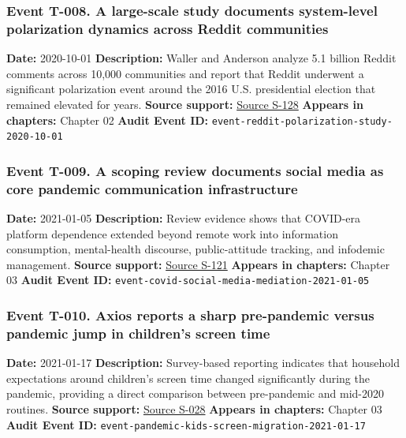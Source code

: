 \documentclass[
  american,
  11pt,
  letterpaper,
]{article}
\begin{document}
\subsubsection{Event T-008. A large-scale study documents system-level
polarization dynamics across Reddit
communities}\label{event-t-008-a-large-scale-study-documents-system-level-polarization-dynamics-across-reddit-communities}

\textbf{Date:} 2020-10-01 \textbf{Description:} Waller and Anderson
analyze 5.1 billion Reddit comments across 10,000 communities and report
that Reddit underwent a significant polarization event around the 2016
U.S. presidential election that remained elevated for years.
\textbf{Source support:}
\hyperref[source-s-128-quantifying-social-organization-and-political-polarization-in-online-platforms]{Source
S-128} \textbf{Appears in chapters:} Chapter 02 \textbf{Audit Event ID:}
\texttt{event-reddit-polarization-study-2020-10-01}

\subsubsection{Event T-009. A scoping review documents social media as
core pandemic communication
infrastructure}\label{event-t-009-a-scoping-review-documents-social-media-as-core-pandemic-communication-infrastructure}

\textbf{Date:} 2021-01-05 \textbf{Description:} Review evidence shows
that COVID-era platform dependence extended beyond remote work into
information consumption, mental-health discourse, public-attitude
tracking, and infodemic management. \textbf{Source support:}
\hyperref[source-s-121-what-social-media-told-about-us-in-the-time-of-covid-19-a-scoping-review]{Source
S-121} \textbf{Appears in chapters:} Chapter 03 \textbf{Audit Event ID:}
\texttt{event-covid-social-media-mediation-2021-01-05}

\subsubsection{Event T-010. Axios reports a sharp pre-pandemic versus
pandemic jump in children's screen
time}\label{event-t-010-axios-reports-a-sharp-pre-pandemic-versus-pandemic-jump-in-children-s-screen-time}

\textbf{Date:} 2021-01-17 \textbf{Description:} Survey-based reporting
indicates that household expectations around children's screen time
changed significantly during the pandemic, providing a direct comparison
between pre-pandemic and mid-2020 routines. \textbf{Source support:}
\hyperref[source-s-028-kids-screen-time-up-50-during-pandemic]{Source
S-028} \textbf{Appears in chapters:} Chapter 03 \textbf{Audit Event ID:}
\texttt{event-pandemic-kids-screen-migration-2021-01-17}
\end{document}
